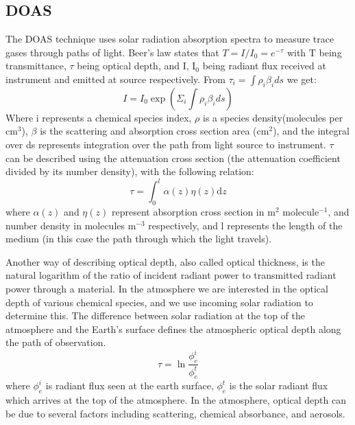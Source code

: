   \subsection{DOAS}
    \label{Model:Meas:DOAS}
  
    The DOAS technique uses solar radiation absorption spectra to measure trace gases through paths of light.
    Beer's law states that $ T = I/I_0 = e^{-\tau} $ with T being transmittance, $\tau$ being optical depth, and I, I$_0$ being radiant flux received at instrument and emitted at source respectively.
    From $ \tau_i = \int \rho_i \beta_i ds $ we get:
    $$ I = I_0 \exp {\left( \Sigma_i \int \rho_i \beta_i ds \right) } $$
    Where i represents a chemical species index, $\rho$ is a species density(molecules per cm$^3$), $\beta$ is the scattering and absorption cross section area (cm$^2$), and the integral over ds represents integration over the path from light source to instrument.
    $\tau$ can be described using the attenuation cross section (the attenuation coefficient divided by its number density), with the following relation:
    \begin{equation*}
      \tau = \int_0^l \alpha(z)\eta(z)\mathrm{d}z
    \end{equation*}
    where $\alpha(z)$ and $\eta(z)$ represent absorption cross section in m$^2$ molecule$^{-1}$, and number density in molecules m$^{-3}$ respectively, and l represents the length of the medium (in this case the path through which the light travels). 
    
    Another way of describing optical depth, also called optical thickness, is the natural logarithm of the ratio of incident radiant power to transmitted radiant power through a material.
    In the atmosphere we are interested in the optical depth of various chemical species, and we use incoming solar radiation to determine this.
    The difference between solar radiation at the top of the atmosphere and the Earth's surface defines the atmospheric optical depth along the path of observation.
    \begin{equation*}
      \tau = \ln{\frac{\phi_e^i}{\phi_e^t}}
    \end{equation*}
    where $\phi_e^i$ is radiant flux seen at the earth surface, $\phi_e^t$ is the solar radiant flux which arrives at the top of the atmosphere.
    In the atmosphere, optical depth can be due to several factors including scattering, chemical absorbance, and aerosols.
    
